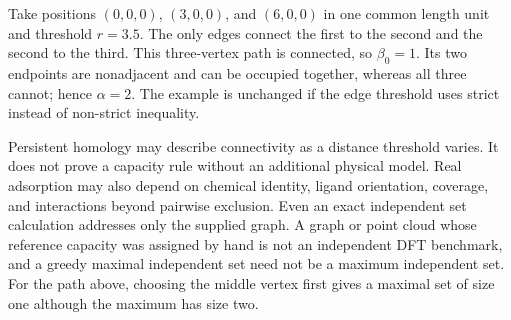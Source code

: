 \begin{example}
Take positions $(0,0,0)$, $(3,0,0)$, and $(6,0,0)$ in one common length
unit and threshold $r=3.5$. The only edges connect the first to the second
and the second to the third. This three-vertex path is connected, so
$\beta_0=1$. Its two endpoints are nonadjacent and can be occupied together,
whereas all three cannot; hence $\alpha=2$. The example is unchanged if the
edge threshold uses strict instead of non-strict inequality.
\end{example}

Persistent homology may describe connectivity as a distance threshold varies.
It does not prove a capacity rule without an additional physical model. Real
adsorption may also depend on chemical identity, ligand orientation, coverage,
and interactions beyond pairwise exclusion. Even an exact independent set
calculation addresses only the supplied graph. A graph or point cloud whose
reference capacity was assigned by hand is not an independent DFT benchmark,
and a greedy maximal independent set need not be a maximum independent set.
For the path above, choosing the middle vertex first gives a maximal set of
size one although the maximum has size two.
